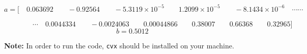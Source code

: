 \begin{footnotesize}
$$
a= \text{[}\quad 0.063692  \qquad  -0.92564 \qquad -5.3119\times 10^{-5}  \qquad   1.2099\times 10^{-5} \qquad -8.1434 \times 10^{-6} \quad  \cdots\cdots
$$

$$
\qquad \qquad  \cdots \quad 0.0044334    \qquad -0.0024063 \qquad   0.00044866       \qquad  0.38007 \qquad    0.66368 \qquad  0.32965 \text{]}
$$
$$
b = 0.5012
$$
\end{footnotesize}



\textbf{Note:} In order to run the code, \texttt{cvx} should be installed on your machine. 